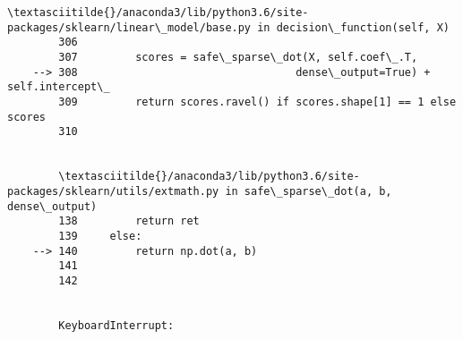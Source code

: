 \documentclass[11pt]{article}
\begin{document}
\begin{Verbatim}[commandchars=\\\{\}]
        \textasciitilde{}/anaconda3/lib/python3.6/site-packages/sklearn/linear\_model/base.py in decision\_function(self, X)
        306 
        307         scores = safe\_sparse\_dot(X, self.coef\_.T,
    --> 308                                  dense\_output=True) + self.intercept\_
        309         return scores.ravel() if scores.shape[1] == 1 else scores
        310 


        \textasciitilde{}/anaconda3/lib/python3.6/site-packages/sklearn/utils/extmath.py in safe\_sparse\_dot(a, b, dense\_output)
        138         return ret
        139     else:
    --> 140         return np.dot(a, b)
        141 
        142 


        KeyboardInterrupt: 

    \end{Verbatim}


    
    
    
    
\end{document}
